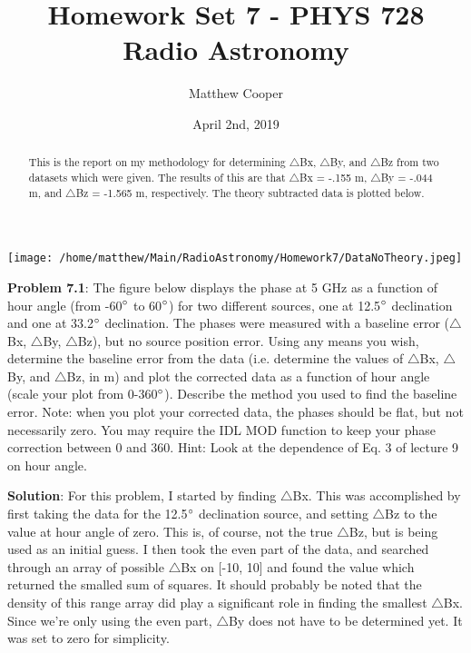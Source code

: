 \documentclass{article}
\title{Homework Set 7 - PHYS 728 Radio Astronomy}
\author{Matthew Cooper}
\date{April 2nd, 2019}
\begin{document}
\begin{titlingpage}
    \maketitle
    \begin{abstract}
	This is the report on my methodology for determining $\triangle$Bx, $\triangle$By, and 		$\triangle$Bz from two datasets which were given.  The results of this are that $		 	\triangle$Bx = -.155 m, $\triangle$By = -.044 m, and $\triangle$Bz = -1.565 m, 			 	respectively.  The theory subtracted data is plotted below.
    \end{abstract}
	\texttt{[image: /home/matthew/Main/RadioAstronomy/Homework7/DataNoTheory.jpeg]}


\end{titlingpage}

\textbf{Problem 7.1}:  The figure below displays the phase at 5 GHz as a function of hour angle (from -60$\degree$ to 60$\degree$) for two different sources, one at 12.5$\degree$ declination and one at 33.2$\degree$ declination. The phases were measured with a baseline error ($\triangle$Bx, $\triangle$By, $\triangle$Bz), but no source position error.  Using any means you wish, determine the baseline error from the data (i.e. determine the values of $\triangle$Bx, $\triangle$By, and $\triangle$Bz, in m) and plot the corrected data as a function of hour angle (scale your plot from 0-360$\degree$). Describe the method you used to find the baseline error. Note: when you plot your corrected data, the phases should be flat, but not necessarily zero. You may require the IDL MOD function to keep your phase correction between 0 and 360. Hint: Look at the dependence of Eq. 3 of lecture 9 on hour angle.

\bigskip
\textbf{Solution}:  For this problem, I started by finding $\triangle$Bx.  This was accomplished by first taking the data for the 12.5$\degree$ declination source, and setting $\triangle$Bz to the value at hour angle of zero.  This is, of course, not the true $\triangle$Bz, but is being used as an initial guess.  I then took the even part of the data, and searched through an array of possible $\triangle$Bx on [-10, 10] and found the value which returned the smalled sum of squares.  It should probably be noted that the density of this range array did play a significant role in finding the smallest $\triangle$Bx.  Since we're only using the even part, $\triangle$By does not have to be determined yet.  It was set to zero for simplicity.
\end{document}

